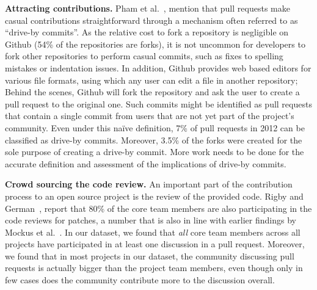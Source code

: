 \documentclass{sig-alternate}
\begin{document}
%
\textbf{Attracting contributions.} Pham et al.~\cite{Pham13}, mention
that pull requests make casual contributions straightforward through
a mechanism often referred to as ``drive-by commits''. As the
relative cost to fork a repository is negligible on Github (54\% of the
repositories are forks), it is not uncommon for developers to fork other
repositories to perform casual commits, such as fixes to spelling mistakes or
indentation issues. In addition, Github provides web based editors
for various file formats, using which any user can edit a file in another
repository; Behind the scenes, Github will fork the repository and ask the user
to create a pull request to the original one. Such commits might be identified
as pull requests that contain a single commit from users that are not yet part
of the project's community. Even under this na\"ive definition, 7\% of pull
requests in 2012 can be classified as drive-by commits. Moreover, 3.5\% of the
forks were created for the sole purpose of creating a drive-by commit. More
work needs to be done for the accurate definition and assessment of the
implications of drive-by commits.

\textbf{Crowd sourcing the code review.}
An important part of the contribution process to an open source project is the
review of the provided code. Rigby and German~\cite{Rigby06},
report that 80\% of the core team members are also participating in the code
reviews for patches, a number that is also in line with earlier findings by
Mockus et al.~\cite{MOCKU02}. In our dataset, we found that \emph{all} core
team members across all projects have participated in at least
one discussion in a pull request. Moreover, we found that in most projects
in our dataset, the community discussing pull requests is actually bigger
than the project team members, even though only in few cases does the community
contribute more to the discussion overall.
\end{document}
